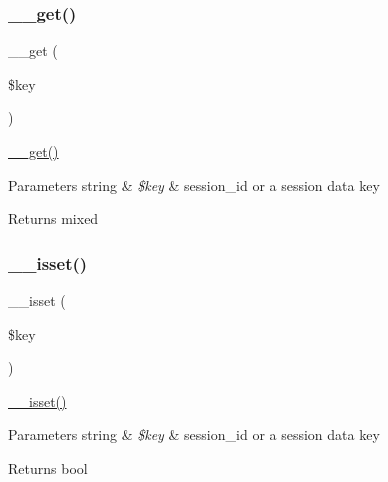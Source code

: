 \subsubsection{\texorpdfstring{\+\_\+\+\_\+get()}{\_\_get()}}
{\footnotesize\ttfamily \+\_\+\+\_\+get (\begin{DoxyParamCaption}\item[{}]{\$key }\end{DoxyParamCaption})}

\mbox{\hyperlink{class_c_i___session_a4537dad3b44254124991341cc91b28fb}{\+\_\+\+\_\+get()}}


\begin{DoxyParams}[1]{Parameters}
string & {\em \$key} & \textquotesingle{}session\+\_\+id\textquotesingle{} or a session data key \\
\hline
\end{DoxyParams}
\begin{DoxyReturn}{Returns}
mixed 
\end{DoxyReturn}
\mbox{\label{class_c_i___session_ae858fed7cd2822fbceac154138b68baa}} 
\subsubsection{\texorpdfstring{\+\_\+\+\_\+isset()}{\_\_isset()}}
{\footnotesize\ttfamily \+\_\+\+\_\+isset (\begin{DoxyParamCaption}\item[{}]{\$key }\end{DoxyParamCaption})}

\mbox{\hyperlink{class_c_i___session_ae858fed7cd2822fbceac154138b68baa}{\+\_\+\+\_\+isset()}}


\begin{DoxyParams}[1]{Parameters}
string & {\em \$key} & \textquotesingle{}session\+\_\+id\textquotesingle{} or a session data key \\
\hline
\end{DoxyParams}
\begin{DoxyReturn}{Returns}
bool 
\end{DoxyReturn}
\mbox{\label{class_c_i___session_a79b36d71c6f1d4f9e6c4c3e34c081456}} 
